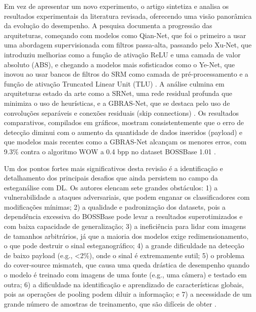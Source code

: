 \documentclass[12pt]{article}
\begin{document}
Em vez de apresentar um novo experimento, o artigo sintetiza e analisa os resultados experimentais da literatura revisada, oferecendo uma visão panorâmica da evolução do desempenho. A pesquisa documenta a progressão das arquiteturas, começando com modelos como Qian-Net, que foi o primeiro a usar uma abordagem supervisionada com filtros passa-alta, passando pelo Xu-Net, que introduziu melhorias como a função de ativação ReLU e uma camada de valor absoluto (ABS), e chegando a modelos mais sofisticados como o Ye-Net, que inovou ao usar bancos de filtros do SRM como camada de pré-processamento e a função de ativação Truncated Linear Unit (TLU) \cite{LaCroix2024survey}. A análise culmina em arquiteturas estado da arte como a SRNet, uma rede residual profunda que minimiza o uso de heurísticas, e a GBRAS-Net, que se destaca pelo uso de convoluções separáveis e conexões residuais (skip connections) \cite{LaCroix2024survey}. Os resultados comparativos, compilados em gráficos, mostram consistentemente que o erro de detecção diminui com o aumento da quantidade de dados inseridos (payload) e que modelos mais recentes como a GBRAS-Net alcançam os menores erros, com 9.3\% contra o algoritmo WOW a 0.4 bpp no dataset BOSSBase 1.01 \cite{LaCroix2024survey}.

Um dos pontos fortes mais significativos desta revisão é a identificação e detalhamento dos principais desafios que ainda persistem no campo da esteganálise com DL. Os autores elencam sete grandes obstáculos: 1) a vulnerabilidade a ataques adversariais, que podem enganar os classificadores com modificações mínimas; 2) a qualidade e padronização dos datasets, pois a dependência excessiva do BOSSBase pode levar a resultados superotimizados e com baixa capacidade de generalização; 3) a ineficiência para lidar com imagens de tamanhos arbitrários, já que a maioria dos modelos exige redimensionamento, o que pode destruir o sinal esteganográfico; 4) a grande dificuldade na detecção de baixo payload (e.g., <2\%), onde o sinal é extremamente sutil; 5) o problema do cover-source mismatch, que causa uma queda drástica de desempenho quando o modelo é treinado com imagens de uma fonte (e.g., uma câmera) e testado em outra; 6) a dificuldade na identificação e aprendizado de características globais, pois as operações de pooling podem diluir a informação; e 7) a necessidade de um grande número de amostras de treinamento, que são difíceis de obter \cite{LaCroix2024survey}.



\newpage
\end{document}
